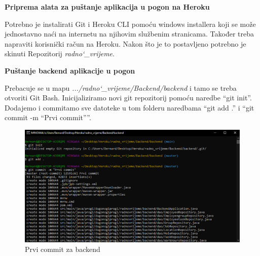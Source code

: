 		
			
			
\textbf{Priprema alata za puštanje aplikacija u pogon na Heroku}

    Potrebno je instalirati Git i Heroku CLI pomoću windows installera koji se može jednostavno naći na internetu na njihovim službenim stranicama. Također treba napraviti korisnički račun na Heroku. Nakon što je to postavljeno potrebno je skinuti Repozitorij \textit{radno\char`_vrijeme}. 
    
\textbf{Puštanje backend aplikacije u pogon} 

Prebacuje se u mapu \textit{.../radno\char`_vrijeme/Backend/backend} i tamo se treba otvoriti Git Bash. Inicijaliziramo novi git repozitorij pomoću naredbe “git init”. Dodajemo i commitamo sve datoteke u tom folderu naredbama “git add .” i “git commit -m “Prvi commit””. 


            \begin{figure}[H] 					\centering 					                \includegraphics[width=\textwidth]{Dokumentacija/pogon/Picture1.png}
				\caption{Prvi commit za backend}
				\end{figure}
				
